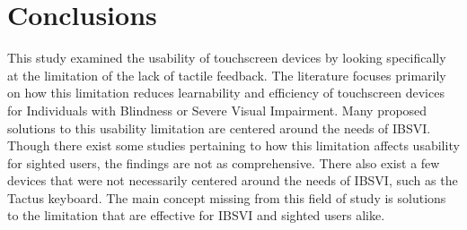 \documentclass[11pt]{article}
\begin{document}
\section{Conclusions}
This study examined the usability of touchscreen devices by looking specifically at the limitation of the lack of tactile feedback. The literature focuses primarily on how this limitation reduces learnability and efficiency of touchscreen devices for Individuals with Blindness or Severe Visual Impairment. Many proposed solutions to this usability limitation are centered around the needs of IBSVI. Though there exist some studies pertaining to how this limitation affects usability for sighted users, the findings are not as comprehensive. There also exist a few devices that were not necessarily centered around the needs of IBSVI, such as the Tactus keyboard. The main concept missing from this field of study is solutions to the limitation that are effective for IBSVI and sighted users alike.

\clearpage

{}

\end{document}
